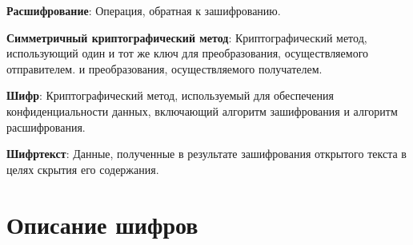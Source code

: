 \documentclass[colorthm]{../civarticle}
\begin{document}
\textbf{Расшифрование}: Операция, обратная к зашифрованию.

\textbf{Симметричный криптографический метод}: Криптографический метод, использующий один и тот же ключ для преобразования, осуществляемого отправителем. и преобразования, осуществляемого получателем.

\textbf{Шифр}: Криптографический метод, используемый для обеспечения конфиденциальности данных, включающий алгоритм зашифрования и алгоритм расшифрования.

\textbf{Шифртекст}: Данные, полученные в результате зашифрования открытого текста в целях скрытия его содержания.


\section{Описание шифров}
\end{document}
